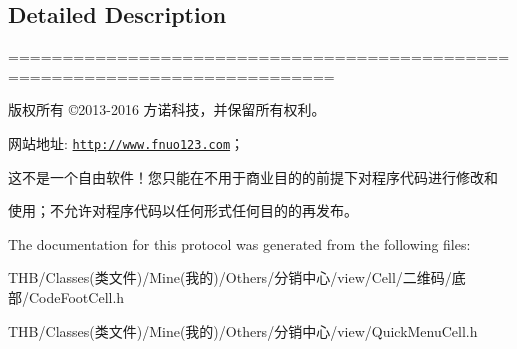 \subsection{Detailed Description}
============================================================================

版权所有 ©2013-\/2016 方诺科技，并保留所有权利。

网站地址\+: \href{http://www.fnuo123.com}{\tt http\+://www.\+fnuo123.\+com}； 



这不是一个自由软件！您只能在不用于商业目的的前提下对程序代码进行修改和

使用；不允许对程序代码以任何形式任何目的的再发布。 

 

The documentation for this protocol was generated from the following files\+:\begin{DoxyCompactItemize}
\item 
T\+H\+B/\+Classes(类文件)/\+Mine(我的)/\+Others/分销中心/view/\+Cell/二维码/底部/Code\+Foot\+Cell.\+h\item 
T\+H\+B/\+Classes(类文件)/\+Mine(我的)/\+Others/分销中心/view/Quick\+Menu\+Cell.\+h\end{DoxyCompactItemize}
